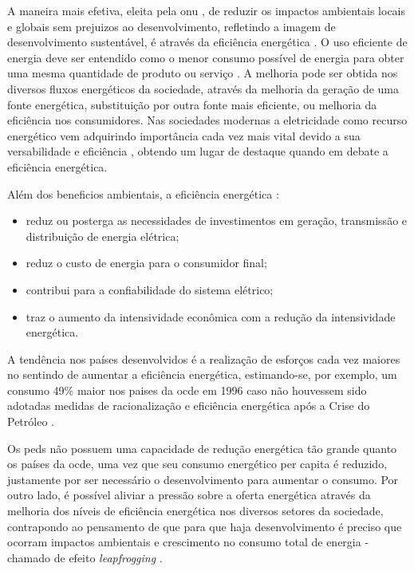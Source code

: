 
A maneira mais efetiva, eleita pela \gls{onu} \cite{onu}, de reduzir os impactos ambientais locais e globais sem
prejuizos ao desenvolvimento, refletindo a imagem de desenvolvimento
sustentável, é através da eficiência energética \cite{rippel,dissert_artur_cursino}. O uso eficiente de 
energia deve ser entendido como o menor consumo possível de energia para obter uma mesma 
quantidade de produto ou serviço \cite{pen15_eff_energ}. A melhoria pode ser obtida nos diversos
fluxos energéticos da sociedade, através da melhoria da geração de uma fonte 
energética, substituição por outra fonte mais eficiente, ou melhoria da
eficiência nos consumidores. Nas sociedades modernas a eletricidade 
como recurso energético vem adquirindo importância cada vez mais vital devido a
sua versabilidade e eficiência \cite{pen15_eff_energ,dissert_caires}, 
obtendo um lugar de destaque quando em debate a eficiência energética. 

Além dos beneficios ambientais, a eficiência energética \cite{jannuzzi,slides_eff_energetica}: 

\begin{itemize}
\item reduz ou posterga as necessidades de investimentos em geração, transmissão 
e distribuição de energia elétrica; 
\item reduz o custo de energia para o consumidor final; 
\item contribui para a confiabilidade do sistema elétrico; 
\item traz o aumento da intensividade econômica com a redução da intensividade
energética. 
\end{itemize}

A tendência nos países desenvolvidos é a realização de esforços 
cada vez maiores no sentindo de aumentar a eficiência energética, 
estimando-se, por exemplo, um consumo 49\% maior nos paises da \gls{ocde} 
em 1996 caso não houvessem sido adotadas medidas de racionalização 
e eficiência energética após a Crise do Petróleo
\cite{goldemberg,slides_eff_energetica}.

Os \glspl{ped} não possuem uma capacidade de redução energética tão grande
quanto os países da \gls{ocde}, uma vez que seu consumo energético per capita é
reduzido, justamente por ser necessário o desenvolvimento para aumentar o
consumo. Por outro lado, é possível aliviar a pressão sobre a
oferta energética através da melhoria dos níveis de eficiência energética nos
diversos setores da sociedade, contrapondo ao pensamento de que para que
haja desenvolvimento é preciso que ocorram impactos ambientais e crescimento no
consumo total de energia - chamado de efeito \emph{leapfrogging}
\cite{goldemberg,dissert_maria_ines_matos}. 

